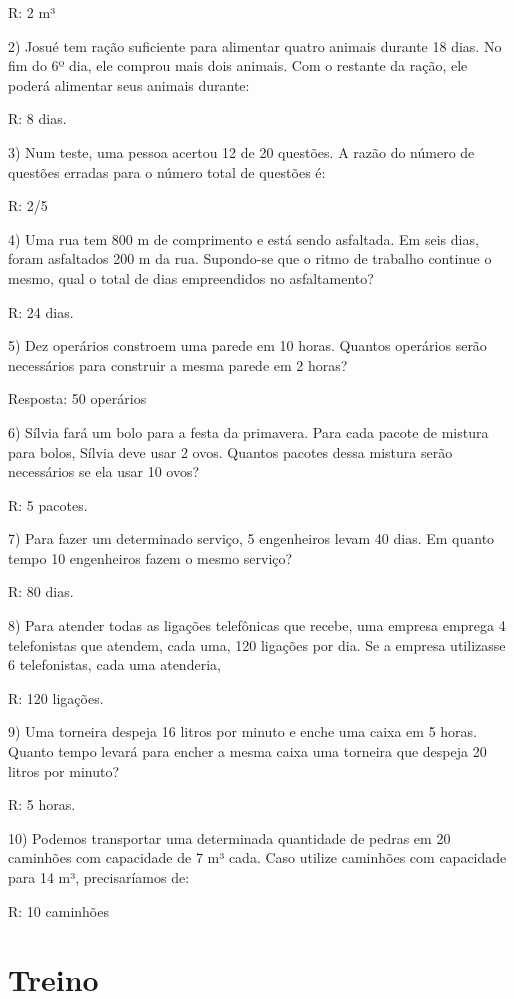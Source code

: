 R: 2 m³

2) Josué tem ração suficiente para alimentar quatro animais durante 18
dias. No fim do 6º dia, ele comprou mais dois animais. Com o restante da
ração, ele poderá alimentar seus animais durante:

R: 8 dias.

3) Num teste, uma pessoa acertou 12 de 20 questões. A razão do número de
questões erradas para o número total de questões é:

R: 2/5

4) Uma rua tem 800 m de comprimento e está sendo asfaltada. Em seis
dias, foram asfaltados 200 m da rua. Supondo-se que o ritmo de trabalho
continue o mesmo, qual o total de dias empreendidos no asfaltamento?

R: 24 dias.

5) Dez operários constroem uma parede em 10 horas. Quantos operários
serão necessários para construir a mesma parede em 2 horas?

Resposta: 50 operários

6) Sílvia fará um bolo para a festa da primavera. Para cada pacote de
mistura para bolos, Sílvia deve usar 2 ovos. Quantos pacotes dessa
mistura serão necessários se ela usar 10 ovos?

R: 5 pacotes.

7) Para fazer um determinado serviço, 5 engenheiros levam 40 dias. Em
quanto tempo 10 engenheiros fazem o mesmo serviço?

R: 80 dias.

8) Para atender todas as ligações telefônicas que recebe, uma empresa
emprega 4 telefonistas que atendem, cada uma, 120 ligações por dia. Se a
empresa utilizasse 6 telefonistas, cada uma atenderia,

R: 120 ligações.

9) Uma torneira despeja 16 litros por minuto e enche uma caixa em 5
horas. Quanto tempo levará para encher a mesma caixa uma torneira que
despeja 20 litros por minuto?

R: 5 horas.

10) Podemos transportar uma determinada quantidade de pedras em 20
caminhões com capacidade de 7 m³ cada. Caso utilize caminhões com
capacidade para 14 m³, precisaríamos de:

R: 10 caminhões

\section{Treino}

